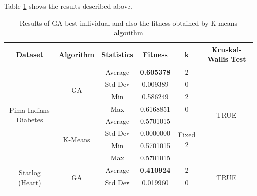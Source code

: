 \documentclass[journal]{IEEEtran}
\begin{document}
	Table \ref{results-ga-and-kmeans} shows the results described above. 
	
	\begin{table}[]
		\centering
		\caption{Results of GA best individual and also the fitness obtained by K-means algorithm}
		\label{results-ga-and-kmeans}
		\begin{tabular}{|c|c|c|c|c|c|}
			\hline
			\textbf{Dataset}           & \textbf{Algorithm} & \textbf{Statistics} & \textbf{Fitness} & \textbf{k}    & \textbf{Kruskal-Wallis Test}   \\ \hline
			\multirow{8}{*}{Pima Indians Diabetes} & \multirow{4}{*}{GA}           & Average                        & \textbf{0.605378}                    & 2                        & \multirow{8}{*}{TRUE} \\ \cline{3-5}
			&                               & Std Dev                        & 0.009389                    & 0                        &                       \\ \cline{3-5}
			&                               & Min                            & 0.586249                    & 2                        &                       \\ \cline{3-5}
			&                               & Max                            & 0.6168851                   & 0                        &                       \\ \cline{2-5}
			& \multirow{4}{*}{K-Means}      & Average                        & 0.5701015                   & \multirow{4}{*}{Fixed 2} &                       \\ \cline{3-4}
			&                               & Std Dev                        & 0.0000000                   &                          &                       \\ \cline{3-4}
			&                               & Min                            & 0.5701015                   &                          &                       \\ \cline{3-4}
			&                               & Max                            & 0.5701015                   &                          &                       \\ \hline
			\multirow{8}{*}{Statlog (Heart)}       & \multirow{4}{*}{GA}           & Average                        & \textbf{0.410924}                    & 2                        & \multirow{8}{*}{TRUE} \\ \cline{3-5}
			&                               & Std Dev                        & 0.019960                    & 0                        &                       \\ \cline{3-5}

\end{tabular}
\end{table}
\end{document}
